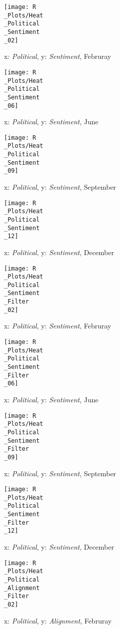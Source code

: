 \documentclass[twoside,twocolumn]{article}
\begin{document}
	\begin{figure}
		\texttt{[image: R\\\_Plots/Heat\\\_Political\\\_Sentiment\\\_02]}
		\caption{x: \textit{Political}, y: \textit{Sentiment}, Februray}\label{fig:R_Heat_Political_Sentiment_02}
	\end{figure}
	\begin{figure}
		\texttt{[image: R\\\_Plots/Heat\\\_Political\\\_Sentiment\\\_06]}
		\caption{x: \textit{Political}, y: \textit{Sentiment}, June}\label{fig:R_Heat_Political_Sentiment_06}
	\end{figure}
	\begin{figure}
		\texttt{[image: R\\\_Plots/Heat\\\_Political\\\_Sentiment\\\_09]}
		\caption{x: \textit{Political}, y: \textit{Sentiment}, September}\label{fig:R_Heat_Political_Sentiment_09}
	\end{figure}
	\begin{figure}
		\texttt{[image: R\\\_Plots/Heat\\\_Political\\\_Sentiment\\\_12]}
		\caption{x: \textit{Political}, y: \textit{Sentiment}, December}\label{fig:R_Heat_Political_Sentiment_12}
	\end{figure}
	\begin{figure}
		\texttt{[image: R\\\_Plots/Heat\\\_Political\\\_Sentiment\\\_Filter\\\_02]}
		\caption{x: \textit{Political}, y: \textit{Sentiment}, Februray}\label{fig:R_Heat_Political_Sentiment_Filter_02}
	\end{figure}
	\begin{figure}
		\texttt{[image: R\\\_Plots/Heat\\\_Political\\\_Sentiment\\\_Filter\\\_06]}
		\caption{x: \textit{Political}, y: \textit{Sentiment}, June}\label{fig:R_Heat_Political_Sentiment_Filter_06}
	\end{figure}
	\begin{figure}
		\texttt{[image: R\\\_Plots/Heat\\\_Political\\\_Sentiment\\\_Filter\\\_09]}
		\caption{x: \textit{Political}, y: \textit{Sentiment}, September}\label{fig:R_Heat_Political_Sentiment_Filter_09}
	\end{figure}
	\begin{figure}
		\texttt{[image: R\\\_Plots/Heat\\\_Political\\\_Sentiment\\\_Filter\\\_12]}
		\caption{x: \textit{Political}, y: \textit{Sentiment}, December}\label{fig:R_Heat_Political_Sentiment_Filter_12}
	\end{figure}
	\begin{figure}
		\texttt{[image: R\\\_Plots/Heat\\\_Political\\\_Alignment\\\_Filter\\\_02]}
		\caption{x: \textit{Political}, y: \textit{Alignment}, Februray}\label{fig:R_Heat_Political_Alignment_Filter_02}
	\end{figure}
\end{document}
